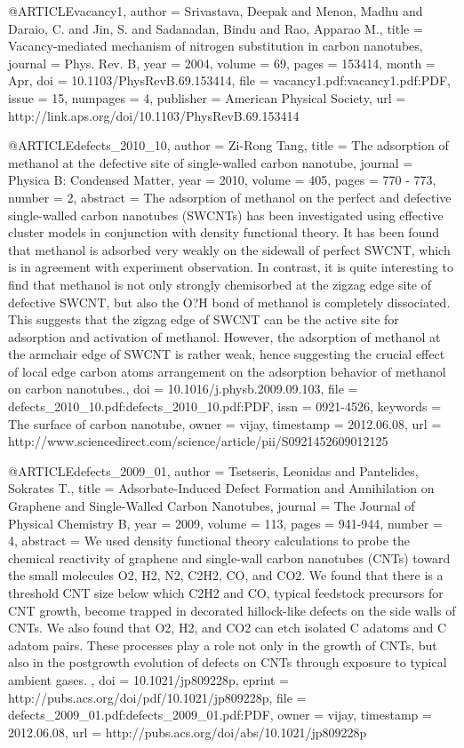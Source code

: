 @ARTICLE{vacancy1,
  author = {Srivastava, Deepak and Menon, Madhu and Daraio, C. and Jin, S. and
	Sadanadan, Bindu and Rao, Apparao M.},
  title = {Vacancy-mediated mechanism of nitrogen substitution in carbon nanotubes},
  journal = {Phys. Rev. B},
  year = {2004},
  volume = {69},
  pages = {153414},
  month = {Apr},
  doi = {10.1103/PhysRevB.69.153414},
  file = {vacancy1.pdf:vacancy1.pdf:PDF},
  issue = {15},
  numpages = {4},
  publisher = {American Physical Society},
  url = {http://link.aps.org/doi/10.1103/PhysRevB.69.153414}
}

@ARTICLE{defects_2010_10,
  author = {Zi-Rong Tang},
  title = {The adsorption of methanol at the defective site of single-walled
	carbon nanotube},
  journal = {Physica B: Condensed Matter},
  year = {2010},
  volume = {405},
  pages = {770 - 773},
  number = {2},
  abstract = {The adsorption of methanol on the perfect and defective single-walled
	carbon nanotubes (SWCNTs) has been investigated using effective cluster
	models in conjunction with density functional theory. It has been
	found that methanol is adsorbed very weakly on the sidewall of perfect
	SWCNT, which is in agreement with experiment observation. In contrast,
	it is quite interesting to find that methanol is not only strongly
	chemisorbed at the zigzag edge site of defective SWCNT, but also
	the O?H bond of methanol is completely dissociated. This suggests
	that the zigzag edge of SWCNT can be the active site for adsorption
	and activation of methanol. However, the adsorption of methanol at
	the armchair edge of SWCNT is rather weak, hence suggesting the crucial
	effect of local edge carbon atoms arrangement on the adsorption behavior
	of methanol on carbon nanotubes.},
  doi = {10.1016/j.physb.2009.09.103},
  file = {defects_2010_10.pdf:defects_2010_10.pdf:PDF},
  issn = {0921-4526},
  keywords = {The surface of carbon nanotube},
  owner = {vijay},
  timestamp = {2012.06.08},
  url = {http://www.sciencedirect.com/science/article/pii/S0921452609012125}
}

@ARTICLE{defects_2009_01,
  author = {Tsetseris, Leonidas and Pantelides, Sokrates T.},
  title = {Adsorbate-Induced Defect Formation and Annihilation on Graphene and
	Single-Walled Carbon Nanotubes},
  journal = {The Journal of Physical Chemistry B},
  year = {2009},
  volume = {113},
  pages = {941-944},
  number = {4},
  abstract = { We used density functional theory calculations to probe the chemical
	reactivity of graphene and single-wall carbon nanotubes (CNTs) toward
	the small molecules O2, H2, N2, C2H2, CO, and CO2. We found that
	there is a threshold CNT size below which C2H2 and CO, typical feedstock
	precursors for CNT growth, become trapped in decorated hillock-like
	defects on the side walls of CNTs. We also found that O2, H2, and
	CO2 can etch isolated C adatoms and C adatom pairs. These processes
	play a role not only in the growth of CNTs, but also in the postgrowth
	evolution of defects on CNTs through exposure to typical ambient
	gases. },
  doi = {10.1021/jp809228p},
  eprint = {http://pubs.acs.org/doi/pdf/10.1021/jp809228p},
  file = {defects_2009_01.pdf:defects_2009_01.pdf:PDF},
  owner = {vijay},
  timestamp = {2012.06.08},
  url = {http://pubs.acs.org/doi/abs/10.1021/jp809228p}
}

